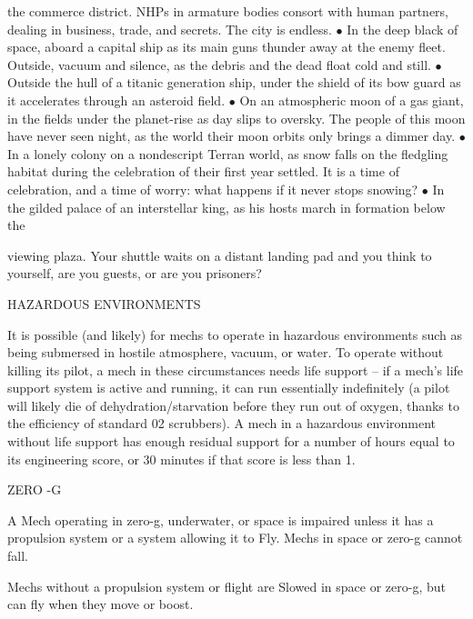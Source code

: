     the commerce district. NHPs in armature bodies consort with human partners, dealing in  
    business, trade, and secrets. The city is endless.    
$\bullet$    In the deep black of space, aboard a capital ship as its main guns thunder away at the  
    enemy fleet. Outside, vacuum and silence, as the debris and the dead float cold and still.    
$\bullet$    Outside the hull of a titanic generation ship, under the shield of its bow guard as it  
    accelerates through an asteroid field.    
$\bullet$    On an atmospheric moon of a gas giant, in the fields under the planet-rise as day slips to  
    oversky. The people of this moon have never seen night, as the world their moon orbits  
    only brings a dimmer day.     
$\bullet$    In a lonely colony on a nondescript Terran world, as snow falls on the fledgling habitat  
    during the celebration of their first year settled. It is a time of celebration, and a time of  
    worry: what happens if it never stops snowing?    
$\bullet$    In the gilded palace of an interstellar king, as his hosts march in formation below the  

    viewing plaza. Your shuttle waits on a distant landing pad and you think to yourself, are  
    you guests, or are you prisoners?    

                                                                                                     


HAZARDOUS ENVIRONMENTS  

It is possible (and likely) for mechs to operate in hazardous environments such as being  
submersed in hostile atmosphere, vacuum, or water. To operate without killing its pilot, a mech in  
these circumstances needs life support -- if a mech’s life support system is active and running,  
it can run essentially indefinitely (a pilot will likely die of dehydration/starvation before they run  
out of oxygen, thanks to the efficiency of standard 02 scrubbers). A mech in a hazardous  
environment without life support has enough residual support for a number of hours equal to its  
engineering score, or 30 minutes if that score is less than 1.
 

                                                 ZERO -G  

A Mech operating in zero-g, underwater, or space is impaired unless it has a propulsion system  
or a system allowing it to Fly. Mechs in space or zero-g cannot fall.
 

Mechs without a propulsion system or flight are Slowed in space or zero-g, but can fly when  
they move or boost.
 

